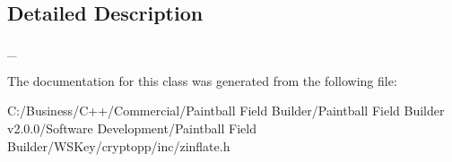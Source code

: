 \subsection{Detailed Description}
\_\- 

The documentation for this class was generated from the following file:\begin{DoxyCompactItemize}
\item 
C:/Business/C++/Commercial/Paintball Field Builder/Paintball Field Builder v2.0.0/Software Development/Paintball Field Builder/WSKey/cryptopp/inc/zinflate.h\end{DoxyCompactItemize}
